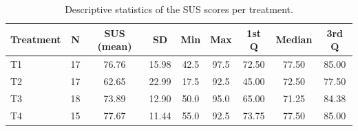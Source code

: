 \begin{table}[tbp]
\centering
\begin{tabular}{lcccccccc}
\toprule
Treatment & N & SUS (mean) & SD & Min & Max & 1st Q & Median & 3rd Q \\ \midrule
T1 & 17 & 76.76 & 15.98 & 42.5 & 97.5 & 72.50 & 77.50 & 85.00 \\
T2 & 17 & 62.65 & 22.99 & 17.5 & 92.5 & 45.00 & 72.50 & 77.50 \\
T3 & 18 & 73.89 & 12.90 & 50.0 & 95.0 & 65.00 & 71.25 & 84.38 \\
T4 & 15 & 77.67 & 11.44 & 55.0 & 92.5 & 73.75 & 77.50 & 85.00 \\
\bottomrule
\end{tabular}
\caption{Descriptive statistics of the SUS scores per treatment.}
\label{tab:sus-score-stats}
\end{table}
